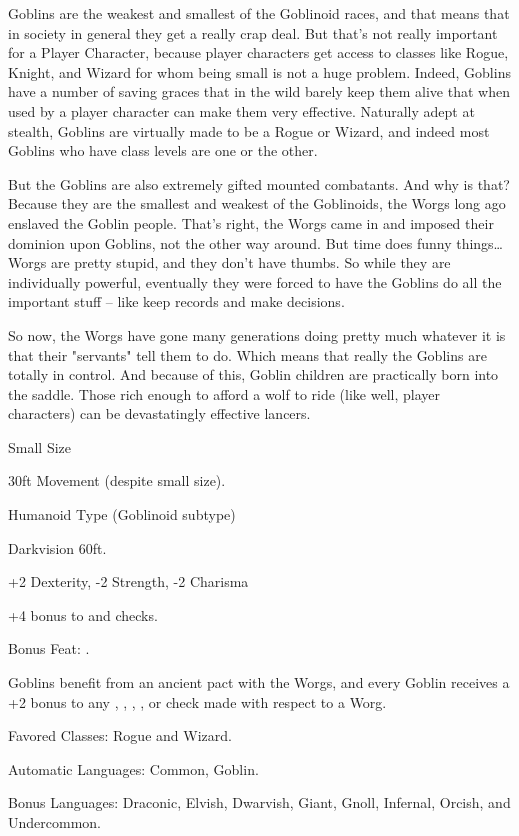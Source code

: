 
Goblins are the weakest and smallest of the Goblinoid races, and that means that in society in general they get a really crap deal. But that's not really important for a Player Character, because player characters get access to classes like Rogue, Knight, and Wizard for whom being small is not a huge problem. Indeed, Goblins have a number of saving graces that in the wild barely keep them alive that when used by a player character can make them very effective. Naturally adept at stealth, Goblins are virtually made to be a Rogue or Wizard, and indeed most Goblins who have class levels are one or the other.

But the Goblins are also extremely gifted mounted combatants. And why is that? Because they are the smallest and weakest of the Goblinoids, the Worgs long ago enslaved the Goblin people. That's right, the Worgs came in and imposed their dominion upon Goblins, not the other way around. But time does funny things\ldots{} Worgs are pretty stupid, and they don't have thumbs. So while they are individually powerful, eventually they were forced to have the Goblins do all the important stuff -- like keep records and make decisions.

So now, the Worgs have gone many generations doing pretty much whatever it is that their "servants" tell them to do. Which means that really the Goblins are totally in control. And because of this, Goblin children are practically born into the saddle. Those rich enough to afford a wolf to ride (like well, player characters) can be devastatingly effective lancers.

\begin{itemize*}
\item Small Size
\item 30ft Movement (despite small size).
\item Humanoid Type (Goblinoid subtype)
\item Darkvision 60ft.
\item +2 Dexterity, -2 Strength, -2 Charisma
\item +4 bonus to  and  checks.
\item Bonus Feat: .
\item Goblins benefit from an ancient pact with the Worgs, and every Goblin receives a +2 bonus to any , , , , or  check made with respect to a Worg.
\item Favored Classes: Rogue and Wizard.
\item Automatic Languages: Common, Goblin.
\item Bonus Languages: Draconic, Elvish, Dwarvish, Giant, Gnoll, Infernal, Orcish, and Undercommon.
\end{itemize*}
